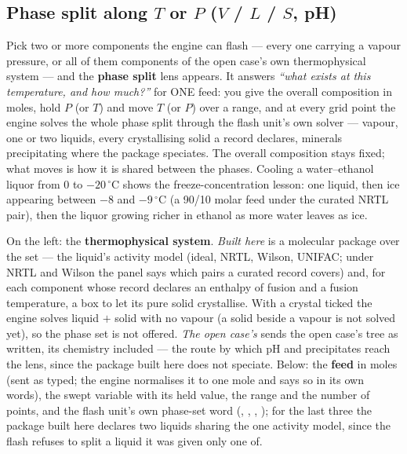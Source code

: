 \documentclass[11pt,a4paper]{article}
\begin{document}
\subsection{Phase split along $T$ or $P$ ($V$ / $L$ / $S$, pH)}\label{sec:explorer-phase-split}
Pick two or more components the engine can flash --- every one carrying a
vapour pressure, or all of them components of the open case's own
thermophysical system --- and the \textbf{phase split} lens appears.  It
answers \emph{``what exists at this temperature, and how much?''} for ONE
feed: you give the overall composition in moles, hold $P$ (or $T$) and move
$T$ (or $P$) over a range, and at every grid point the engine solves the
whole phase split through the flash unit's own solver --- vapour, one or two
liquids, every crystallising solid a record declares, minerals precipitating
where the package speciates.  The overall composition stays fixed; what
moves is how it is shared between the phases.  Cooling a water--ethanol
liquor from $0$ to $-20\,^\circ\mathrm{C}$ shows the freeze-concentration
lesson: one liquid, then ice appearing between $-8$ and $-9\,^\circ\mathrm{C}$ (a 90/10 molar feed under the curated NRTL pair), then the
liquor growing richer in ethanol as more water leaves as ice.

On the left: the \textbf{thermophysical system}.  \emph{Built here} is a
molecular package over the set --- the liquid's activity model (ideal, NRTL,
Wilson, UNIFAC; under NRTL and Wilson the panel says which pairs a curated
record covers) and, for each component whose record declares an enthalpy of
fusion and a fusion temperature, a box to let its pure solid crystallise.
With a crystal ticked the engine solves liquid $+$ solid with no vapour (a
solid beside a vapour is not solved yet), so the phase set is not offered.
\emph{The open case's} sends the open case's  tree as
written, its chemistry included --- the route by which pH and precipitates
reach the lens, since the package built here does not speciate.  Below: the
\textbf{feed} in moles (sent as typed; the engine normalises it to one mole
and says so in its own words), the swept variable with its held value, the
range and the number of points, and the flash unit's own phase-set word
(, , , ); for the last three the
package built here declares two liquids sharing the one activity model, since
the flash refuses to split a liquid it was given only one of.
\end{document}
